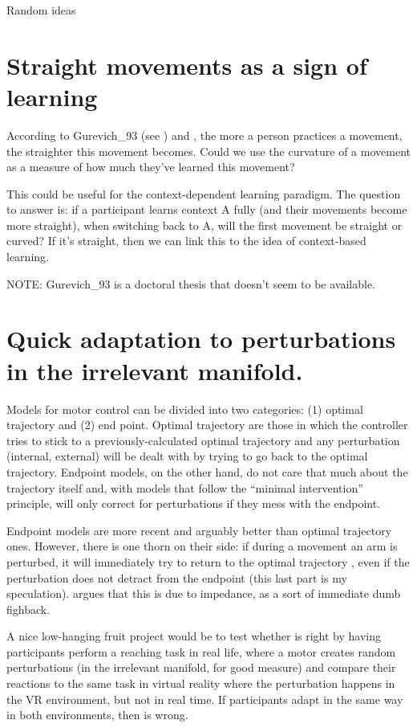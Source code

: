 \documentclass{report}
\begin{document}
\begin{chapter}{Random ideas}
\section{Straight movements as a sign of learning}
According to Gurevich\_93 (see \cite{Wolpert_Are_1995}) and \cite{Shadmehr_Adaptive_1994}, the more a person practices a movement, the straighter this movement becomes. Could we use the curvature of a movement as a measure of how much they've learned this movement?

This could be useful for the context-dependent learning paradigm. The question to answer is: if a participant learns context A fully (and their movements become more straight), when switching back to A, will the first movement be straight or curved? If it's straight, then we can link this to the idea of context-based learning.

NOTE: Gurevich\_93 is a doctoral thesis that doesn't seem to be available.


\section{Quick adaptation to perturbations in the irrelevant manifold.}
Models for motor control can be divided into two categories: (1) optimal trajectory and (2) end point. Optimal trajectory are those in which the controller tries to stick to a previously-calculated optimal trajectory and any perturbation (internal, external) will be dealt with by trying to go back to the optimal trajectory. Endpoint models, on the other hand, do not care that much about the trajectory itself and, with models that follow the ``minimal intervention'' principle, will only correct for perturbations if they mess with the endpoint.

Endpoint models are more recent and arguably better than optimal trajectory ones. However, there is one thorn on their side: if during a movement an arm is perturbed, it will immediately try to return to the optimal trajectory \citep{Bizzi_Posture_1984}, even if the perturbation does not detract from the endpoint (this last part is my speculation). \cite{Todorov_Optimality_2004} argues that this is due to impedance, as a sort of immediate dumb fighback.

A nice low-hanging fruit project would be to test whether \cite{Todorov_Optimality_2004} is right by having participants perform a reaching task in real life, where a motor creates random perturbations (in the irrelevant manifold, for good measure) and compare their reactions to the same task in virtual reality where the perturbation happens in the VR environment, but not in real time. If participants adapt in the same way in both environments, then \cite{Todorov_Optimality_2004} is wrong.

\end{chapter}
\end{document}
